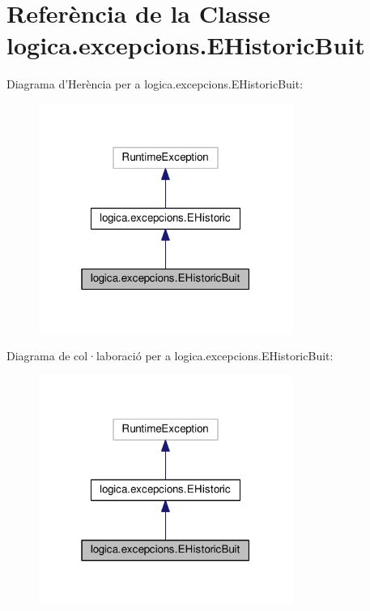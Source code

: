 \hypertarget{classlogica_1_1excepcions_1_1_e_historic_buit}{\section{Referència de la Classe logica.\+excepcions.\+E\+Historic\+Buit}
\label{classlogica_1_1excepcions_1_1_e_historic_buit}
}


Diagrama d'Herència per a logica.\+excepcions.\+E\+Historic\+Buit\+:\nopagebreak
\begin{figure}[H]
\begin{center}
\leavevmode
\includegraphics[width=235pt]{classlogica_1_1excepcions_1_1_e_historic_buit__inherit__graph}
\end{center}
\end{figure}


Diagrama de col·laboració per a logica.\+excepcions.\+E\+Historic\+Buit\+:\nopagebreak
\begin{figure}[H]
\begin{center}
\leavevmode
\includegraphics[width=235pt]{classlogica_1_1excepcions_1_1_e_historic_buit__coll__graph}
\end{center}
\end{figure}
